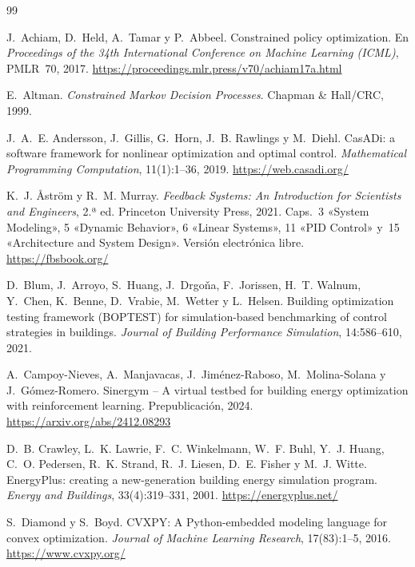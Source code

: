 \begin{thebibliography}{99}
\small

J.~Achiam, D.~Held, A.~Tamar y P.~Abbeel.
\newblock Constrained policy optimization.
\newblock En \emph{Proceedings of the 34th International Conference on Machine Learning (ICML)}, PMLR~70, 2017.
\newblock \url{https://proceedings.mlr.press/v70/achiam17a.html}

E.~Altman.
\newblock \emph{Constrained Markov Decision Processes}.
\newblock Chapman \& Hall/CRC, 1999.

J.~A.~E. Andersson, J.~Gillis, G.~Horn, J.~B. Rawlings y M.~Diehl.
\newblock CasADi: a software framework for nonlinear optimization and optimal control.
\newblock \emph{Mathematical Programming Computation}, 11(1):1--36, 2019.
\newblock \url{https://web.casadi.org/}

K.~J. Åström y R.~M. Murray.
\newblock \emph{Feedback Systems: An Introduction for Scientists and Engineers}, 2.ª ed.
\newblock Princeton University Press, 2021. Caps.~3 «System Modeling», 5 «Dynamic Behavior», 6 «Linear Systems», 11 «PID Control» y~15 «Architecture and System Design». Versión electrónica libre.
\newblock \url{https://fbsbook.org/}

D.~Blum, J.~Arroyo, S.~Huang, J.~Drgoňa, F.~Jorissen, H.~T. Walnum, Y.~Chen, K.~Benne, D.~Vrabie, M.~Wetter y L.~Helsen.
\newblock Building optimization testing framework (BOPTEST) for simulation-based benchmarking of control strategies in buildings.
\newblock \emph{Journal of Building Performance Simulation}, 14:586--610, 2021.

A.~Campoy-Nieves, A.~Manjavacas, J.~Jiménez-Raboso, M.~Molina-Solana y J.~Gómez-Romero.
\newblock Sinergym -- A virtual testbed for building energy optimization with reinforcement learning.
\newblock Prepublicación, 2024.
\newblock \url{https://arxiv.org/abs/2412.08293}

D.~B. Crawley, L.~K. Lawrie, F.~C. Winkelmann, W.~F. Buhl, Y.~J. Huang, C.~O. Pedersen, R.~K. Strand, R.~J. Liesen, D.~E. Fisher y M.~J. Witte.
\newblock EnergyPlus: creating a new-generation building energy simulation program.
\newblock \emph{Energy and Buildings}, 33(4):319--331, 2001.
\newblock \url{https://energyplus.net/}

S.~Diamond y S.~Boyd.
\newblock CVXPY: A Python-embedded modeling language for convex optimization.
\newblock \emph{Journal of Machine Learning Research}, 17(83):1--5, 2016.
\newblock \url{https://www.cvxpy.org/}


\end{thebibliography}
